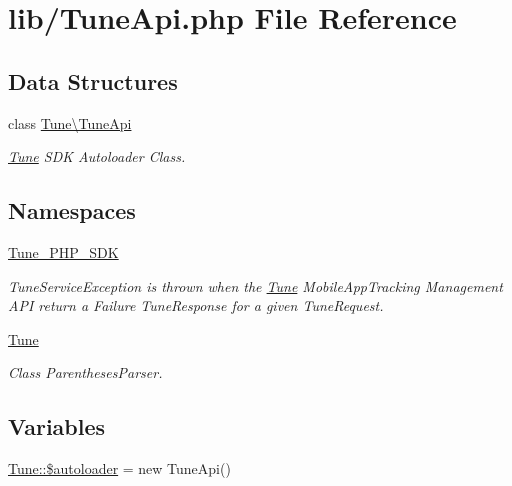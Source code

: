 \hypertarget{TuneApi_8php}{\section{lib/\-Tune\-Api.php File Reference}
\label{TuneApi_8php}
}
\subsection*{Data Structures}
\begin{DoxyCompactItemize}
\item 
class \hyperlink{classTune_1_1TuneApi}{Tune\textbackslash{}\-Tune\-Api}
\begin{DoxyCompactList}\small\item\em \hyperlink{namespaceTune}{Tune} S\-D\-K Autoloader Class. \end{DoxyCompactList}\end{DoxyCompactItemize}
\subsection*{Namespaces}
\begin{DoxyCompactItemize}
\item 
\hyperlink{namespaceTune__PHP__SDK}{Tune\-\_\-\-P\-H\-P\-\_\-\-S\-D\-K}
\begin{DoxyCompactList}\small\item\em Tune\-Service\-Exception is thrown when the \hyperlink{namespaceTune}{Tune} Mobile\-App\-Tracking Management A\-P\-I return a Failure Tune\-Response for a given Tune\-Request. \end{DoxyCompactList}\item 
\hyperlink{namespaceTune}{Tune}
\begin{DoxyCompactList}\small\item\em Class Parentheses\-Parser. \end{DoxyCompactList}\end{DoxyCompactItemize}
\subsection*{Variables}
\begin{DoxyCompactItemize}
\item 
\hyperlink{namespaceTune_a45833c84db9823c05fccd9d72c991286}{Tune\-::\$autoloader} = new Tune\-Api()
\end{DoxyCompactItemize}
